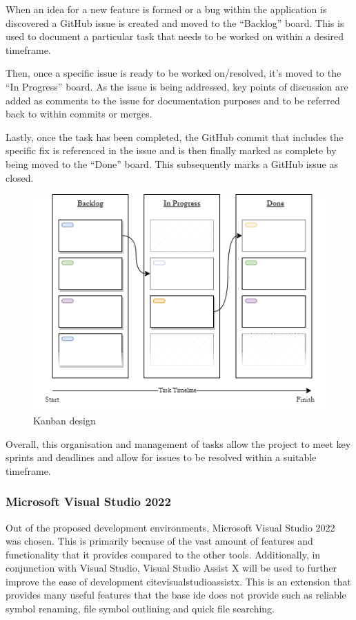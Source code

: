 \documentclass[11pt]{article}
\begin{document}
When an idea for a new feature is formed or a bug within the application is
discovered a GitHub issue is created and moved to the ``Backlog'' board. This is
used to document a particular task that needs to be worked on within a desired
timeframe.

Then, once a specific issue is ready to be worked on/resolved, it's moved to the
``In Progress'' board. As the issue is being addressed, key points of discussion
are added as comments to the issue for documentation purposes and to be referred
back to within commits or merges.

Lastly, once the task has been completed, the GitHub commit that includes the
specific fix is referenced in the issue and is then finally marked as complete
by being moved to the ``Done'' board. This subsequently marks a GitHub issue as
closed.
\begin{figure}[H]
  \centering
  \includegraphics[width=\textwidth]{images/kanban_design.png}
  \caption{Kanban design}
  \label{fig:kanban_design}
\end{figure}

Overall, this organisation and management of tasks allow the project to meet key
sprints and deadlines and allow for issues to be resolved within a suitable
timeframe.

\subsubsection{Microsoft Visual Studio 2022} \label{development_environment}
Out of the proposed development environments, Microsoft Visual Studio 2022 was
chosen. This is primarily because of the vast amount of features and
functionality that it provides compared to the other tools. Additionally, in
conjunction with Visual Studio, Visual Studio Assist X will be used to further
improve the ease of development cite{visualstudioassistx}. This is an extension
that provides many useful features that the base \gls*{ide} does not provide
such as reliable symbol renaming, file symbol outlining and quick file
searching.
\end{document}
